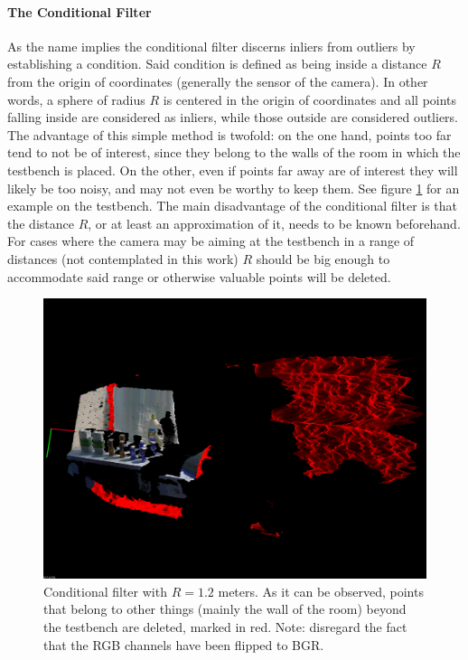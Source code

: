 \documentclass[../main.tex]{subfiles}
\begin{document}
\paragraph{The Conditional Filter}
As the name implies the conditional filter discerns inliers from outliers by establishing a condition. Said condition is defined as being inside a distance $R$ from the origin of coordinates (generally the sensor of the camera). In other words, a sphere of radius $R$ is centered in the origin of coordinates and all points falling inside are considered as inliers, while those outside are considered outliers. The advantage of this simple method is twofold: on the one hand, points too far tend to not be of interest, since they belong to the walls of the room in which the testbench is placed. On the other, even if points far away are of interest they will likely be too noisy, and may not even be worthy to keep them. See figure \ref{fig:conditional_filter_testbench} for an example on the testbench. The main disadvantage of the conditional filter is that the distance $R$, or at least an approximation of it, needs to be known beforehand. For cases where the camera may be aiming at the testbench in a range of distances (not contemplated in this work) $R$ should be big enough to accommodate said range or otherwise valuable points will be deleted.

\begin{figure}[htbp]
    \centering
    \includegraphics[width=1\textwidth]{images/conditional_filter_testbench.png}
    \caption{Conditional filter with $R=1.2$ meters. As it can be observed, points that belong to other things (mainly the wall of the room) beyond the testbench are deleted, marked in red. Note: disregard the fact that the RGB channels have been flipped to BGR.}
    \label{fig:conditional_filter_testbench}
\end{figure}
\end{document}
